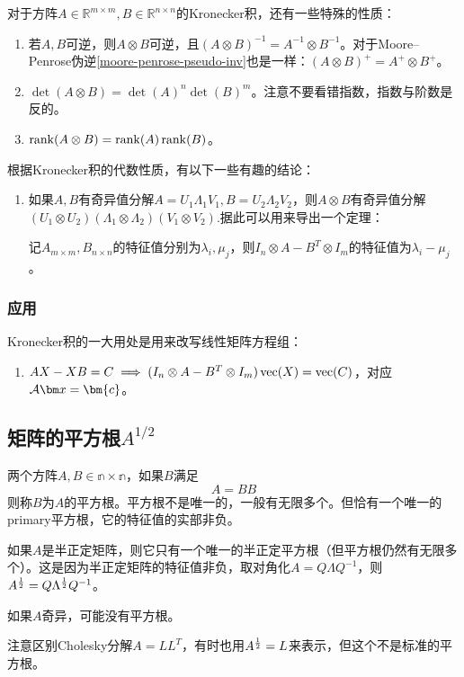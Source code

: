 对于方阵$A\in\mathbb{R}^{m\times m},B\in\mathbb{R}^{n\times n}$的Kronecker积，还有一些特殊的性质：
\begin{enumerate}
\item 若$A,B$可逆，则$A\otimes B$可逆，且$(A\otimes B)^{-1}=A^{-1}\otimes B^{-1}$。对于Moore–Penrose伪逆\ref{moore-penrose-pseudo-inv}也是一样：$(A\otimes B)^+=A^+\otimes B^+$。
\item $\det(A\otimes B)=\det(A)^n\det(B)^m$。注意不要看错指数，指数与阶数是反的。
\item $\operatorname{rank}(A\otimes B)=\operatorname{rank}(A)\operatorname{rank}(B)$。
\end{enumerate}

根据Kronecker积的代数性质，有以下一些有趣的结论：
\begin{enumerate}
\item 如果$A,B$有奇异值分解$A=U_1\Lambda_1 V_1,B=U_2\Lambda_2V_2$，则$A\otimes B$有奇异值分解$(U_1\otimes U_2)(\Lambda_1\otimes \Lambda_2)(V_1\otimes V_2)$.据此可以用来导出一个定理：

记$A_{m\times m},B_{n\times n}$的特征值分别为$\lambda_i,\mu_j$，则$I_n\otimes A-B^T\otimes I_m$的特征值为$\lambda_i-\mu_j$。
\end{enumerate}

\subsubsection{应用}
Kronecker积的一大用处是用来改写线性矩阵方程组：
\begin{enumerate}
\item $AX-XB=C\implies (I_n\otimes A-B^T\otimes I_m)\operatorname{vec}(X)=\operatorname{vec}(C)$，对应$\mathcal{A}\bx=\bm{c}$。
\end{enumerate}
\subsection{矩阵的平方根$A^{1/2}$}
\begin{definition}[矩阵的平方根]\label{matrix-square-root}
两个方阵$A,B\in\mathbb{n\times n}$，如果$B$满足
$$A=BB$$
则称$B$为$A$的平方根。平方根不是唯一的，一般有无限多个。但恰有一个唯一的primary平方根，它的特征值的实部非负。

如果$A$是半正定矩阵，则它只有一个唯一的半正定平方根（但平方根仍然有无限多个）。这是因为半正定矩阵的特征值非负，取对角化$A=Q\Lambda Q^{-1}$，则$A^{\frac{1}{2}}=Q\Lambda^{\frac{1}{2}}Q^{-1}$。

如果$A$奇异，可能没有平方根。
\end{definition}
注意区别Cholesky分解$A=LL^T$，有时也用$A^{\frac{1}{2}}=L$来表示，但这个不是标准的平方根。


